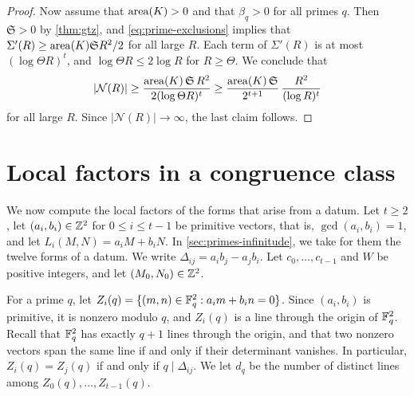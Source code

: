 \begin{proof}
Now assume that $\operatorname{area}(K)>0$ and that $\beta_q>0$ for all primes $q$. Then $\mathfrak S>0$ by \cref{thm:gtz}, and \eqref{eq:prime-exclusions} implies that $\Sigma'(R)\ge\operatorname{area}(K)\mathfrak S R^2/2$ for all large $R$. Each term of $\Sigma'(R)$ is at most $(\log\Theta R)^t$, and $\log\Theta R\le2\log R$ for $R\ge\Theta$. We conclude that
\[
|\mathcal N(R)|\ge\frac{\operatorname{area}(K)\,\mathfrak S\,R^2}{2(\log\Theta R)^t}\ge\frac{\operatorname{area}(K)\,\mathfrak S}{2^{t+1}}\,\frac{R^2}{(\log R)^t}
\]
for all large $R$. Since $|\mathcal N(R)|\to\infty$, the last claim follows.
\end{proof}

\section{Local factors in a congruence class}\label{sec:primes-local}

We now compute the local factors of the forms that arise from a datum. Let $t\ge2$, let $(a_i,b_i)\in\mathbb Z^2$ for $0\le i\le t-1$ be primitive vectors, that is, $\gcd(a_i,b_i)=1$, and let $L_i(M,N)=a_iM+b_iN$. In \cref{sec:primes-infinitude}, we take for them the twelve forms of a datum. We write $\Delta_{ij}=a_ib_j-a_jb_i$. Let $c_0,\dots,c_{t-1}$ and $W$ be positive integers, and let $(M_0,N_0)\in\mathbb Z^2$.

For a prime $q$, let $Z_i(q)=\{(m,n)\in\mathbb F_q^2:a_im+b_in=0\}$. Since $(a_i,b_i)$ is primitive, it is nonzero modulo $q$, and $Z_i(q)$ is a line through the origin of $\mathbb F_q^2$. Recall that $\mathbb F_q^2$ has exactly $q+1$ lines through the origin, and that two nonzero vectors span the same line if and only if their determinant vanishes. In particular, $Z_i(q)=Z_j(q)$ if and only if $q\mid\Delta_{ij}$. We let $d_q$ be the number of distinct lines among $Z_0(q),\dots,Z_{t-1}(q)$.

